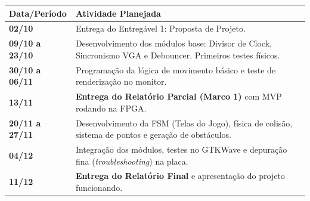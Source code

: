 \documentclass[11pt, a4paper]{article}
\begin{document}
\vspace{0.3cm}
\noindent
\begin{tabularx}{\textwidth}{@{} l X @{}}
    \toprule
    \textbf{Data/Período} & \textbf{Atividade Planejada} \\
    \midrule
    \textbf{02/10} & Entrega do Entregável 1: Proposta de Projeto. \\
    \textbf{09/10 a 23/10} & Desenvolvimento dos módulos base: Divisor de Clock, Sincronismo VGA e Debouncer. Primeiros testes físicos. \\
    \textbf{30/10 a 06/11} & Programação da lógica de movimento básico e teste de renderização no monitor. \\
    \textbf{13/11} & \textbf{Entrega do Relatório Parcial (Marco 1)} com MVP rodando na FPGA. \\
    \textbf{20/11 a 27/11} & Desenvolvimento da FSM (Telas do Jogo), física de colisão, sistema de pontos e geração de obstáculos. \\
    \textbf{04/12} & Integração dos módulos, testes no GTKWave e depuração fina (\textit{troubleshooting}) na placa. \\
    \textbf{11/12} & \textbf{Entrega do Relatório Final} e apresentação do projeto funcionando. \\
    \bottomrule
\end{tabularx}
\end{document}
